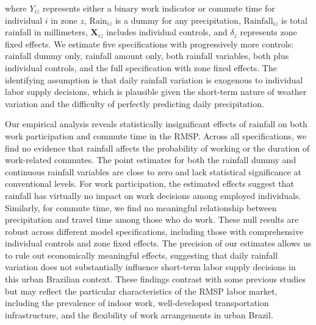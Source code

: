 where $Y_{iz}$ represents either a binary work indicator or commute time for individual $i$ in zone $z$, $\text{Rain}_{iz}$ is a dummy for any precipitation, $\text{Rainfall}_{iz}$ is total rainfall in millimeters, $\mathbf{X}_{iz}$ includes individual controls, and $\delta_z$ represents zone fixed effects. We estimate five specifications with progressively more controls: rainfall dummy only, rainfall amount only, both rainfall variables, both plus individual controls, and the full specification with zone fixed effects. The identifying assumption is that daily rainfall variation is exogenous to individual labor supply decisions, which is plausible given the short-term nature of weather variation and the difficulty of perfectly predicting daily precipitation.

Our empirical analysis reveals statistically insignificant effects of rainfall on both work participation and commute time in the RMSP. Across all specifications, we find no evidence that rainfall affects the probability of working or the duration of work-related commutes. The point estimates for both the rainfall dummy and continuous rainfall variables are close to zero and lack statistical significance at conventional levels. For work participation, the estimated effects suggest that rainfall has virtually no impact on work decisions among employed individuals. Similarly, for commute time, we find no meaningful relationship between precipitation and travel time among those who do work. These null results are robust across different model specifications, including those with comprehensive individual controls and zone fixed effects. The precision of our estimates allows us to rule out economically meaningful effects, suggesting that daily rainfall variation does not substantially influence short-term labor supply decisions in this urban Brazilian context. These findings contrast with some previous studies but may reflect the particular characteristics of the RMSP labor market, including the prevalence of indoor work, well-developed transportation infrastructure, and the flexibility of work arrangements in urban Brazil.

